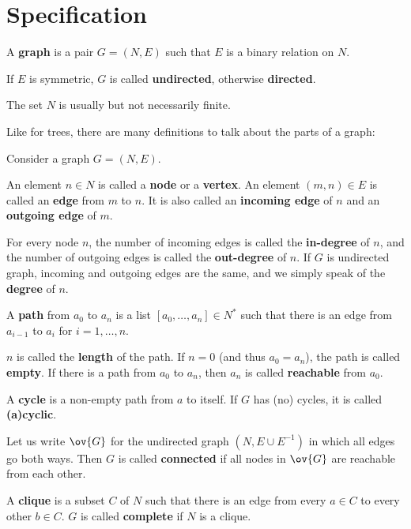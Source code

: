 \section{Specification}

\begin{definition}[Graph]
A \textbf{graph} is a pair $G=(N,E)$ such that $E$ is a binary relation on $N$.

If $E$ is symmetric, $G$ is called \textbf{undirected}, otherwise \textbf{directed}.
\end{definition}

The set $N$ is usually but not necessarily finite.

Like for trees, there are many definitions to talk about the parts of a graph:

\begin{definition}
Consider a graph $G=(N,E)$.

An element $n\in N$ is called a \textbf{node} or a \textbf{vertex}.
An element $(m,n)\in E$ is called an \textbf{edge} from $m$ to $n$.
It is also called an \textbf{incoming edge} of $n$ and an \textbf{outgoing edge} of $m$.

For every node $n$, the number of incoming edges is called the \textbf{in-degree} of $n$, and the number of outgoing edges is called the \textbf{out-degree} of $n$.
If $G$ is undirected graph, incoming and outgoing edges are the same, and we simply speak of the \textbf{degree} of $n$.

A \textbf{path} from $a_0$ to $a_n$ is a list $[a_0,\ldots,a_n]\in N^*$ such that there is an edge from $a_{i-1}$ to $a_i$ for $i=1,\ldots,n$.

$n$ is called the \textbf{length} of the path.
If $n=0$ (and thus $a_0=a_n$), the path is called \textbf{empty}.
If there is a path from $a_0$ to $a_n$, then $a_n$ is called \textbf{reachable} from $a_0$.

A \textbf{cycle} is a non-empty path from $a$ to itself.
If $G$ has (no) cycles, it is called \textbf{(a)cyclic}.

Let us write $\ov{G}$ for the undirected graph $(N, E\cup E^{-1})$ in which all edges go both ways.
Then $G$ is called \textbf{connected} if all nodes in $\ov{G}$ are reachable from each other.

A \textbf{clique} is a subset $C$ of $N$ such that there is an edge from every $a\in C$ to every other $b\in C$.
$G$ is called \textbf{complete} if $N$ is a clique.
\end{definition}


